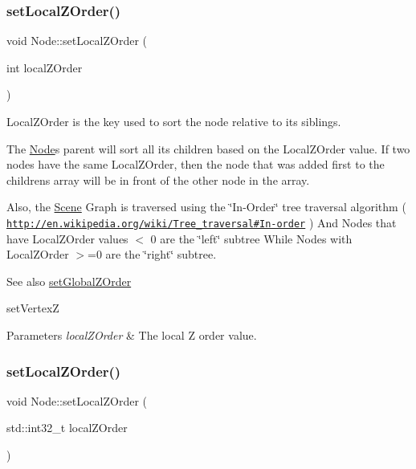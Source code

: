 \subsubsection{\texorpdfstring{set\+Local\+Z\+Order()}{setLocalZOrder()}\hspace{0.1cm}{\footnotesize\ttfamily [1/2]}}
{\footnotesize\ttfamily void Node\+::set\+Local\+Z\+Order (\begin{DoxyParamCaption}\item[{int}]{local\+Z\+Order }\end{DoxyParamCaption})\hspace{0.3cm}{\ttfamily [virtual]}}

Local\+Z\+Order is the \textquotesingle{}key\textquotesingle{} used to sort the node relative to its siblings.

The \hyperlink{classNode}{Node}\textquotesingle{}s parent will sort all its children based on the Local\+Z\+Order value. If two nodes have the same Local\+Z\+Order, then the node that was added first to the children\textquotesingle{}s array will be in front of the other node in the array.

Also, the \hyperlink{classScene}{Scene} Graph is traversed using the \char`\"{}\+In-\/\+Order\char`\"{} tree traversal algorithm ( \href{http://en.wikipedia.org/wiki/Tree_traversal#In-order}{\tt http\+://en.\+wikipedia.\+org/wiki/\+Tree\+\_\+traversal\#\+In-\/order} ) And Nodes that have Local\+Z\+Order values $<$ 0 are the \char`\"{}left\char`\"{} subtree While Nodes with Local\+Z\+Order $>$=0 are the \char`\"{}right\char`\"{} subtree.

\begin{DoxySeeAlso}{See also}
{\ttfamily \hyperlink{classNode_a32a5b9cb9a408d04008c4935a4776566}{set\+Global\+Z\+Order}} 

{\ttfamily set\+VertexZ}
\end{DoxySeeAlso}

\begin{DoxyParams}{Parameters}
{\em local\+Z\+Order} & The local Z order value. \\
\hline
\end{DoxyParams}
\mbox{\label{classNode_a3a240c11ff1bbc265e46bbc2e1d34179}} 
\subsubsection{\texorpdfstring{set\+Local\+Z\+Order()}{setLocalZOrder()}\hspace{0.1cm}{\footnotesize\ttfamily [2/2]}}
{\footnotesize\ttfamily void Node\+::set\+Local\+Z\+Order (\begin{DoxyParamCaption}\item[{std\+::int32\+\_\+t}]{local\+Z\+Order }\end{DoxyParamCaption})\hspace{0.3cm}{\ttfamily [virtual]}}

